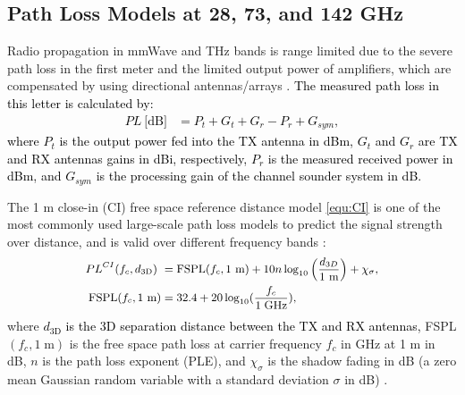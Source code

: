 \documentclass[conference]{IEEEtran}
\begin{document}

\subsection{Path Loss Models at 28, 73, and 142 GHz}
Radio propagation in mmWave and THz bands is range limited due to the severe path loss in the first meter and the limited output power of amplifiers, which are compensated by using directional antennas/arrays \cite{xing21a,rappaport19access}. \textcolor{black}{The measured path loss in this letter is calculated by:
\begin{equation}
\label{equ:PL}
\begin{split}
PL~\text{[dB]} &= P_t + G_t + G_r - P_r + G_{sym},
\end{split}
\end{equation} 
where $P_t$ is the output power fed into the TX antenna in dBm, $G_t$ and $G_r$ are TX and RX antennas gains in dBi, respectively, $P_r$ is the measured received power in dBm, and $G_{sym}$ is the processing gain of the channel sounder system in dB.}

The 1 m close-in (CI) free space reference distance model \eqref{equ:CI} is one of the most commonly used large-scale path loss models to predict the signal strength over distance, and is valid over different frequency bands \cite {Mac15b,rappaport2015wideband, sun2015path,3GPP2019,Ju20a}:
\begin{equation}
\label{equ:CI}
\small
\begin{split}
PL^{CI}(f_c,d_{\text{3D}})\ &= \text{FSPL}(f_c, \text{1 m}) +10n\log_{10}\left( \dfrac{d_{3D}}{\text{1 m}} \right)+ \chi_{\sigma},\\
\text{FSPL}(f_c,\text{1 m}) &= 32.4 + 20\log_{10}(\dfrac{f_c}{1\;\text{GHz}}),
\end{split}
\end{equation}
where \textcolor{black}{ $d_{\text{3D}}$ is the 3D separation distance between the TX and RX antennas,} FSPL$(f_c, 1 \;\text{m})$ is the free space path loss at carrier frequency $f_c$ in GHz at 1 m in dB, $n$ is the path loss exponent (PLE), and $\chi_{\sigma}$ is the shadow fading in dB (a zero mean Gaussian random variable with a standard deviation $\sigma$ in dB) \cite{rappaport2015wideband,Sun16b, sun2015path,Rap02a,Rap15a}.
\end{document}

